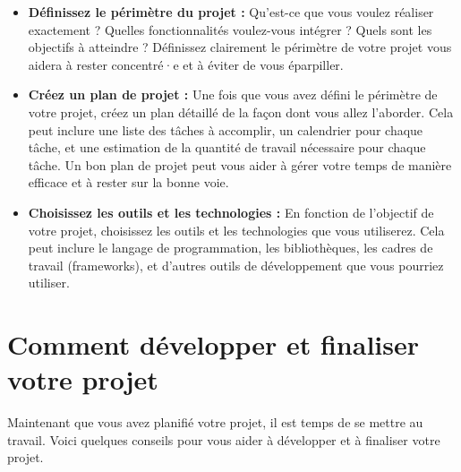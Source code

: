 \begin{itemize}
    \item \textbf{Définissez le périmètre du projet :} Qu'est-ce que vous voulez réaliser exactement ? Quelles fonctionnalités voulez-vous intégrer ? Quels sont les objectifs à atteindre ? Définissez clairement le périmètre de votre projet vous aidera à rester concentré·e et à éviter de vous éparpiller.

    \item \textbf{Créez un plan de projet :} Une fois que vous avez défini le périmètre de votre projet, créez un plan détaillé de la façon dont vous allez l'aborder. Cela peut inclure une liste des tâches à accomplir, un calendrier pour chaque tâche, et une estimation de la quantité de travail nécessaire pour chaque tâche. Un bon plan de projet peut vous aider à gérer votre temps de manière efficace et à rester sur la bonne voie.

    \item \textbf{Choisissez les outils et les technologies :} En fonction de l'objectif de votre projet, choisissez les outils et les technologies que vous utiliserez. Cela peut inclure le langage de programmation, les bibliothèques, les cadres de travail (frameworks), et d'autres outils de développement que vous pourriez utiliser.
\end{itemize}

\section{Comment développer et finaliser votre projet}

Maintenant que vous avez planifié votre projet, il est temps de se mettre au travail. Voici quelques conseils pour vous aider à développer et à finaliser votre projet.

